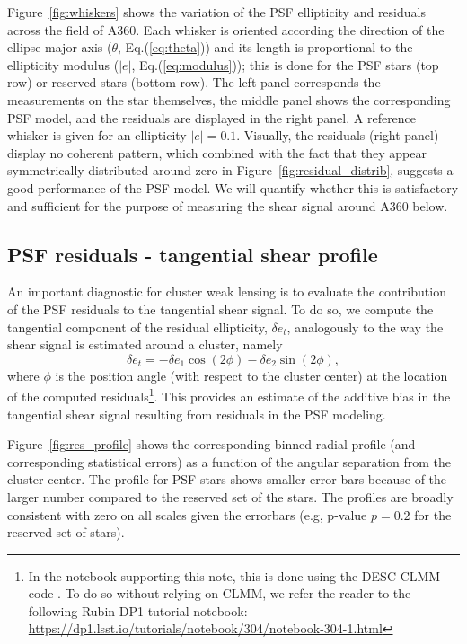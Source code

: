 \documentclass[SE,lsstdraft,authoryear,toc]{lsstdoc}
\begin{document}
Figure~\ref{fig:whiskers} shows the variation of the PSF ellipticity and residuals across the field of A360. Each whisker is oriented according the direction of the ellipse major axis ($\theta$, Eq.(\ref{eq:theta})) and its length is proportional to the ellipticity modulus ($|e|$, Eq.(\ref{eq:modulus})); this is done for the PSF stars (top row) or reserved stars (bottom row). The left panel corresponds the measurements on the star themselves, the middle panel shows the corresponding PSF model, and the residuals are displayed in the right panel. A reference whisker is given for an ellipticity $|e| = 0.1$. Visually, the residuals (right panel) display no coherent pattern, which combined with the fact that they appear symmetrically distributed around zero in Figure~\ref{fig:residual_distrib}, suggests a good performance of the PSF model. We will quantify whether this is satisfactory and sufficient for the purpose of measuring the shear signal around A360 below.


\subsection{PSF residuals - tangential shear profile}

An important diagnostic for cluster weak lensing is to evaluate the contribution of the PSF residuals to the tangential shear signal. To do so, we compute the tangential component of the residual ellipticity, $\delta e_t$, analogously to the way the shear signal is estimated around a cluster, namely 
\begin{equation}
\delta e_t = - \delta e_1  \cos(2 \phi) - \delta e_2  \sin(2 \phi),
\end{equation}
where $\phi$ is the position angle (with respect to the cluster center) at the location of the computed residuals\footnote{In the notebook supporting this note, this is done using the DESC CLMM code \citep{2021MNRAS.508.6092A}. To do so without relying on CLMM, we refer the reader to the following Rubin DP1 tutorial notebook: \url{https://dp1.lsst.io/tutorials/notebook/304/notebook-304-1.html}}. This provides an estimate of the additive bias in the tangential shear signal resulting from residuals in the PSF modeling.

Figure~{\ref{fig:res_profile}} shows the corresponding binned radial profile (and corresponding statistical errors) as a function of the angular separation from the cluster center. The profile for PSF stars shows smaller error bars because of the larger number compared to the reserved set of the stars. The profiles are broadly consistent with zero on all scales given the errorbars (e.g, p-value $p=0.2$ for the reserved set of stars). 
\end{document}

